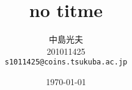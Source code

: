 \documentclass{jsarticle}
\begin{document}
\title{no titme}
\date{\today}
\author{中島光夫\\201011425\\\texttt{s1011425@coins.tsukuba.ac.jp}}
\maketitle
\end{document}
